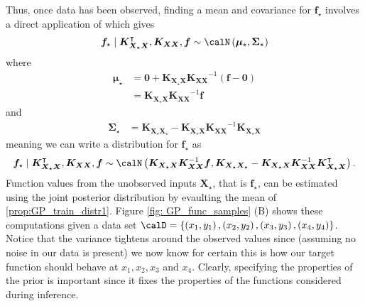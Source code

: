 Thus, once data has been observed, finding a mean and covariance for $\bm{f}_{\star}$ involves a direct application of  which gives
\begin{align*}
    \bm{f}_{\star} \mid \bm{K_{X_{\star}X}}^{\intercal} , \bm{K_{XX}}, \bm{f} \sim \calN \left( \bm{\mu}_{\star}, \bm{\Sigma}_{\star} \right)
\end{align*}
where
\begin{align*}
    \bm{\mu}_{\star} & = \bm{0} + \bm{K_{X_{\star}X}} \bm{K_{XX}}^{-1} \left( \bm{f} - \bm{0} \right) \\
                     & = \bm{K_{X_{\star}X}} \bm{K_{XX}}^{-1} \bm{f}
\end{align*}
and
\begin{align*}
    \bm{\Sigma}_{\star} & = \bm{K_{X_{\star}X_{\star}}} - \bm{K_{X_{\star}X}} \bm{K_{XX}}^{-1} \bm{K_{X_{\star}X}}
\end{align*}
meaning we can write a distribution for $\bm{f}_{\star}$ as
\begin{equation}\label{prop:GP_train_distr1}
    \bm{f}_{\star} \mid \bm{K_{X_{\star}X}}^{\intercal} , \bm{K_{XX}}, \bm{f} \sim \calN \left( \bm{K_{X_{\star}X}} \bm{K_{XX}}^{-1} \bm{f},  \bm{K_{X_{\star}X_{\star}}} - \bm{K_{X_{\star}X}} \bm{K_{XX}}^{-1} \bm{K_{X_{\star}X}}^{\intercal}  \right).
\end{equation}
Function values from the unobserved inputs $\bm{X_{\star}}$, that is $\bm{f}_{\star}$, can be estimated using the joint posterior distribution by evaulting the mean of \ref{prop:GP_train_distr1}. Figure \ref{fig: GP_func_samples} (B) shows these computations given a data set $\calD = \left\{ \left( x_1 , y_1 \right) , \left( x_2 , y_2 \right) , \left( x_3 , y_3 \right) , \left( x_4 , y_4 \right) \right\}$. Notice that the variance tightens around the observed values since (assuming no noise in our data is present) we now know for certain this is how our target function should behave at $x_1,x_2,x_3$ and $x_4$. Clearly, specifying the properties of the prior is important since it fixes the properties of the functions considered during inference.

